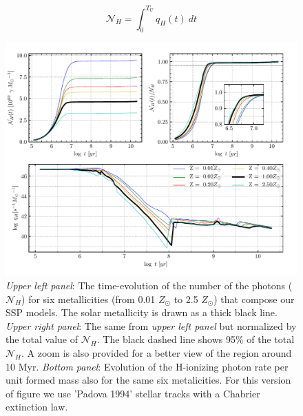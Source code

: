 \documentclass[12pt,letterpaper,usenatbib,useAMS]{article}
\begin{document}
\begin{equation}
	\mathcal{N}_H = \int_0^{T_U} q_H(t)\ dt
\end{equation}
\begin{figure}
    \includegraphics[width=\textwidth]{Nh_logt_metBase_Padova1994_chab.pdf}
    \caption{\emph{Upper left panel}: The time-evolution of the number of the photons ($\mathcal{N}_H$) for six metallicities (from 0.01 $Z_\odot$ to 2.5 $Z_\odot$) that compose our SSP models. The solar metallicity is drawn as a thick black line. \emph{Upper right panel}: The same from \emph{upper left panel} but normalized by the total value of $\mathcal{N}_H$. The black dashed line shows 95\% of the total $\mathcal{N}_H$. A zoom is also provided for a better view of the region around 10 Myr. \emph{Bottom panel}: Evolution of the H-ionizing photon rate per unit formed mass also for the same six metalicities. For this version of figure we use 'Padova 1994' stellar tracks \citep{Bertelli.etal.1994} with a Chabrier extinction law.}
    \label{fig:Nh_qh_Padova1994_chab}
\end{figure}
\end{document}

